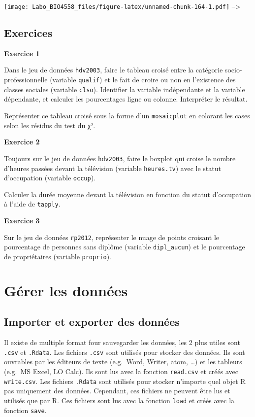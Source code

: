 \documentclass[12pt,]{book}
\begin{document}
\texttt{[image: Labo\_BIO4558\_files/figure-latex/unnamed-chunk-164-1.pdf]}
--\textgreater{}

\hypertarget{ex-introR-biv}{%
\subsection{Exercices}\label{ex-introR-biv}}

\textbf{Exercice 1}

Dans le jeu de données \texttt{hdv2003}, faire le tableau croisé entre la catégorie socio-professionnelle (variable \texttt{qualif}) et le fait de croire ou non en l'existence des classes sociales (variable \texttt{clso}). Identifier la variable indépendante et la variable dépendante, et calculer les pourcentages ligne ou colonne. Interpréter le résultat.

Représenter ce tableau croisé sous la forme d'un \texttt{mosaicplot} en colorant les cases selon les résidus du test du χ².

\textbf{Exercice 2}

Toujours sur le jeu de données \texttt{hdv2003}, faire le boxplot qui croise le nombre d'heures passées devant la télévision (variable \texttt{heures.tv}) avec le statut d'occupation (variable \texttt{occup}).

Calculer la durée moyenne devant la télévision en fonction du statut d'occupation à l'aide de \texttt{tapply}.

\textbf{Exercice 3}

Sur le jeu de données \texttt{rp2012}, représenter le nuage de points croisant le pourcentage de personnes sans diplôme (variable \texttt{dipl\_aucun}) et le pourcentage de propriétaires (variable \texttt{proprio}).

\hypertarget{guxe9rer-les-donnuxe9es}{%
\section{Gérer les données}\label{guxe9rer-les-donnuxe9es}}

\hypertarget{importer-et-exporter-des-donnuxe9es}{%
\subsection{Importer et exporter des données}\label{importer-et-exporter-des-donnuxe9es}}

Il existe de multiple format four sauvegarder les données, les 2 plus utiles sont \texttt{.csv} et \texttt{.Rdata}.
Les fichiers \texttt{.csv} sont utilisés pour stocker des données.
Ils sont ouvrables par les éditeurs de texte (e.g.~Word, Writer, atom, \ldots{}) et les tableurs (e.g.~MS Excel, LO Calc).
Ils sont lus avec la fonction \texttt{read.csv} et créés avec \texttt{write.csv}.
Les fichiers \texttt{.Rdata} sont utilisés pour stocker n'importe quel objet R pas uniquement des données.
Cependant, ces fichiers ne peuvent être lus et utilisés que par R.
Ces fichiers sont lus avec la fonction \texttt{load} et créés avec la fonction \texttt{save}.
\end{document}
